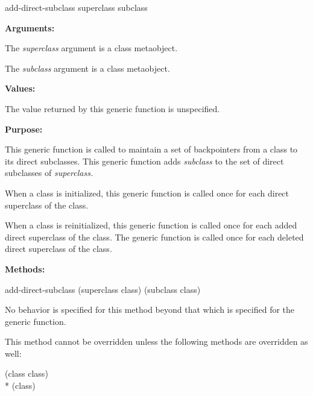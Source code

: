 \begin{defun}
add-direct-subclass superclass subclass

\textbf{Arguments:}

The \emph{superclass} argument is a class metaobject.

The \emph{subclass} argument is a class metaobject.

\textbf{Values:}

The value returned by this generic function is unspecified.

\textbf{Purpose:}

This generic function is called to maintain a set of backpointers from a class
to its direct subclasses. This generic function adds \emph{subclass} to the set
of direct subclasses of \emph{superclass.}

When a class is initialized, this generic function is called once for each
direct superclass of the class. 

When a class is reinitialized, this generic function is called once for each
added direct superclass of the class. The generic function
 is called once for each deleted direct superclass of the
class. 

\textbf{Methods:}

\begin{defun}
add-direct-subclass (superclass class) (subclass class)

No behavior is specified for this method beyond that which is specified for the generic function.

This method cannot be overridden unless the following methods are overridden as well:

\begin{tabbing}
     (class class) \\*
     (class) 
\end{tabbing}
\end{defun}
\end{defun}

